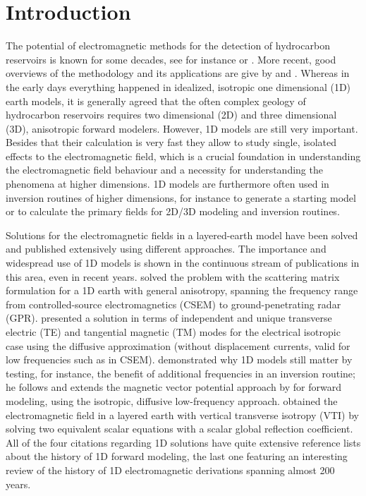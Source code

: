 \documentclass[paper]{geophysics}
\begin{document}
\section{Introduction}

The potential of electromagnetic methods for the detection of hydrocarbon
reservoirs is known for some decades, see for instance \cite{PIEEE.89.Nekut} or
\cite{B.SEG.91.Chave}. More recent, good overviews of the methodology and its
applications are give by \cite{SG.05.Edwards} and \cite{IEEE.12.Ziolkowksi}.
Whereas in the early days everything happened in idealized, isotropic one
dimensional (1D) earth models, it is generally agreed that the often complex
geology of hydrocarbon reservoirs requires two dimensional (2D) and three
dimensional (3D), anisotropic forward modelers. However, 1D models are still
very important. Besides that their calculation is very fast they allow to study
single, isolated effects to the electromagnetic field, which is a crucial
foundation in understanding the electromagnetic field behaviour and a necessity
for understanding the phenomena at higher dimensions. 1D models are furthermore
often used in inversion routines of higher dimensions, for instance to generate
a starting model or to calculate the primary fields for 2D/3D modeling and
inversion routines.

Solutions for the electromagnetic fields in a layered-earth model have been
solved and published extensively using different approaches. The importance and
wide\-spread use of 1D models is shown in the continuous stream of publications
in this area, even in recent years. \cite{GJI.07.Loseth} solved the problem
with the scattering matrix formulation for a 1D earth with general anisotropy,
spanning the frequency range from controlled-source electromagnetics (CSEM) to
ground-pe\-ne\-tra\-ting radar (GPR). \cite{GJI.09.Chave} presented a solution
in terms of independent and unique transverse electric (TE) and tangential
magnetic (TM) modes for the electrical isotropic case using the diffusive
approximation (without displacement currents, valid for low frequencies such as
in CSEM). \cite{GEO.09.Key} demonstrated why 1D models still matter by testing,
for instance, the benefit of additional frequencies in an inversion routine; he
follows and extends the magnetic vector potential approach by
\cite{B.AP.82.Wait} for forward modeling, using the isotropic, diffusive
low-frequency approach. \cite{GEO.15.Hunziker} obtained the electromagnetic
field in a layered earth with vertical transverse iso\-tro\-py (VTI) by solving
two equivalent scalar equations with a scalar global reflection coefficient.
All of the four citations regarding 1D solutions have quite extensive reference
lists about the history of 1D forward modeling, the last one featuring an
interesting review of the history of 1D electromagnetic derivations spanning
almost 200 years.
\end{document}
